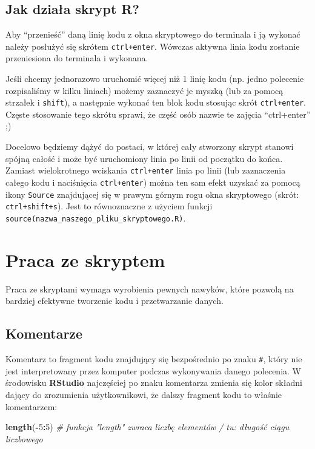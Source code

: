 \documentclass[]{book}
\newenvironment{Shaded}{\begin{snugshade}}{\end{snugshade}}
\newcommand{\KeywordTok}[1]{\textcolor[rgb]{0.13,0.29,0.53}{\textbf{#1}}}
\newcommand{\DecValTok}[1]{\textcolor[rgb]{0.00,0.00,0.81}{#1}}
\newcommand{\CommentTok}[1]{\textcolor[rgb]{0.56,0.35,0.01}{\textit{#1}}}
\newcommand{\OperatorTok}[1]{\textcolor[rgb]{0.81,0.36,0.00}{\textbf{#1}}}
\newcommand{\NormalTok}[1]{#1}
\theoremstyle{definition}
\theoremstyle{definition}
\theoremstyle{definition}
\theoremstyle{remark}
\begin{document}
\subsection*{Jak działa skrypt R?}\label{jak-dziaa-skrypt-r}

Aby ``przenieść'' daną linię kodu z okna skryptowego do terminala i ją
wykonać należy posłużyć się skrótem \texttt{ctrl+enter}. Wówczas aktywna
linia kodu zostanie przeniesiona do terminala i wykonana.

Jeśli chcemy jednorazowo uruchomić więcej niż 1 linię kodu (np. jedno
polecenie rozpisaliśmy w kilku liniach) możemy zaznaczyć je myszką (lub
za pomocą strzałek i \texttt{shift}), a następnie wykonać ten blok kodu
stosując skrót \texttt{ctrl+enter}. Częste stosowanie tego skrótu
sprawi, że część osób nazwie te zajęcia ``ctrl+enter'' ;)

Docelowo będziemy dążyć do postaci, w której cały stworzony skrypt
stanowi spójną całość i może być uruchomiony linia po linii od początku
do końca. Zamiast wielokrotnego wciskania \texttt{ctrl+enter} linia po
linii (lub zaznaczenia całego kodu i naciśnięcia \texttt{ctrl+enter})
można ten sam efekt uzyskać za pomocą ikony \texttt{Source} znajdującej
się w prawym górnym rogu okna skryptowego (skrót:
\texttt{ctrl+shift+s}). Jest to równoznaczne z użyciem funkcji
\texttt{source(nazwa\_naszego\_pliku\_skryptowego.R)}.

\section{Praca ze skryptem}\label{praca-ze-skryptem}

Praca ze skryptami wymaga wyrobienia pewnych nawyków, które pozwolą na
bardziej efektywne tworzenie kodu i przetwarzanie danych.

\subsection{Komentarze}\label{komentarze}

Komentarz to fragment kodu znajdujący się bezpośrednio po znaku
\texttt{\#}, który nie jest interpretowany przez komputer podczas
wykonywania danego polecenia. W środowisku \textbf{RStudio} najczęściej
po znaku komentarza zmienia się kolor składni dający do zrozumienia
użytkownikowi, że dalszy fragment kodu to właśnie komentarzem:

\begin{Shaded}
\begin{Highlighting}[]
\KeywordTok{length}\NormalTok{(}\OperatorTok{-}\DecValTok{5}\OperatorTok{:}\DecValTok{5}\NormalTok{) }\CommentTok{# funkcja "length" zwraca liczbę elementów / tu: długość ciągu liczbowego}
\end{Highlighting}
\end{Shaded}
\end{document}
